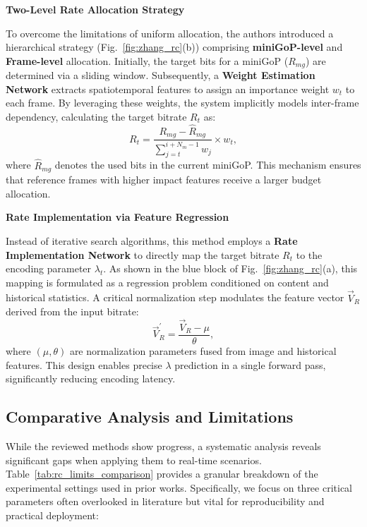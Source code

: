 \noindent \textbf{Two-Level Rate Allocation Strategy}

To overcome the limitations of uniform allocation, the authors introduced a hierarchical strategy (Fig.~\ref{fig:zhang_rc}(b)) comprising \textbf{miniGoP-level} and \textbf{Frame-level} allocation.
Initially, the target bits for a miniGoP ($R_{mg}$) are determined via a sliding window. Subsequently, a \textbf{Weight Estimation Network} extracts spatiotemporal features to assign an importance weight $w_t$ to each frame. By leveraging these weights, the system implicitly models inter-frame dependency, calculating the target bitrate $R_t$ as:
\begin{equation}
R_{t}=\frac{R_{mg}-\hat{R}_{mg}}{\sum_{j=t}^{i+N_{m}-1}w_{j}}\times w_{t},
\end{equation}
where $\hat{R}_{mg}$ denotes the used bits in the current miniGoP. This mechanism ensures that reference frames with higher impact features receive a larger budget allocation.

\noindent \textbf{Rate Implementation via Feature Regression}

Instead of iterative search algorithms, this method employs a \textbf{Rate Implementation Network} to directly map the target bitrate $R_t$ to the encoding parameter $\lambda_t$. As shown in the blue block of Fig.~\ref{fig:zhang_rc}(a), this mapping is formulated as a regression problem conditioned on content and historical statistics. A critical normalization step modulates the feature vector $\vec{V}_{R}$ derived from the input bitrate:
\begin{equation}
\vec{V}_{R}^{\prime}=\frac{\vec{V}_{R}-\mu}{\theta},
\end{equation}
where $(\mu, \theta)$ are normalization parameters fused from image and historical features. This design enables precise $\lambda$ prediction in a single forward pass, significantly reducing encoding latency.

\subsection{Comparative Analysis and Limitations}

While the reviewed methods show progress, a systematic analysis reveals significant gaps when applying them to real-time scenarios. Table~\ref{tab:rc_limits_comparison} provides a granular breakdown of the experimental settings used in prior works. Specifically, we focus on three critical parameters often overlooked in literature but vital for reproducibility and practical deployment:

